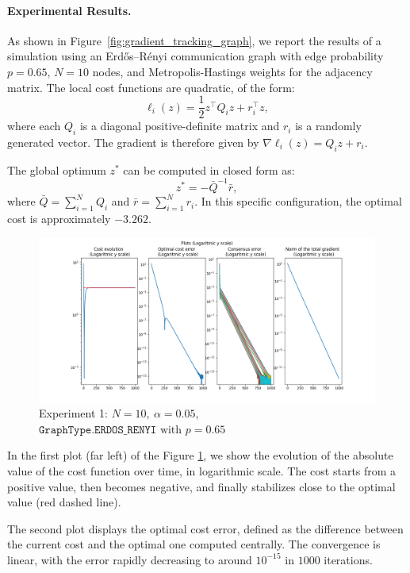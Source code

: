 \paragraph{Experimental Results.}
As shown in Figure~\ref{fig:gradient_tracking_graph}, we report the results of a simulation using an Erd\H{o}s--R\'enyi communication graph with edge probability $p = 0.65$, $N = 10$ nodes, and Metropolis-Hastings weights for the adjacency matrix. The local cost functions are quadratic, of the form:
\[
\ell_i(z) = \frac{1}{2}z^\top Q_i z + r_i^\top z,
\]
where each $Q_i$ is a diagonal positive-definite matrix and $r_i$ is a randomly generated vector. The gradient is therefore given by $\nabla \ell_i(z) = Q_i z + r_i$.

The global optimum $z^*$ can be computed in closed form as:
\[
z^* = -\bar{Q}^{-1} \bar{r},
\]
where $\bar{Q} = \sum_{i=1}^N Q_i$ and $\bar{r} = \sum_{i=1}^N r_i$. In this specific configuration, the optimal cost is approximately $-3.262$.

\begin{figure}[h!]
    \centering
    \hspace*{-1.75cm}\includegraphics[width=1.25\linewidth]{report/figs/gradient_tracking_perf_1.png}
    \caption{Experiment 1: $N=10, \ \alpha=0.05$, $\texttt{GraphType.ERDOS\_RENYI} \text{ with } p=0.65$}
    \label{fig:gradient_tracking_perf}
\end{figure}

In the first plot (far left) of the Figure \ref{fig:gradient_tracking_perf}, we show the evolution of the absolute value of the cost function over time, in logarithmic scale. The cost starts from a positive value, then becomes negative, and finally stabilizes close to the optimal value (red dashed line).

The second plot displays the optimal cost error, defined as the difference between the current cost and the optimal one computed centrally. The convergence is linear, with the error rapidly decreasing to around $10^{-15}$ in $1000$ iterations.

